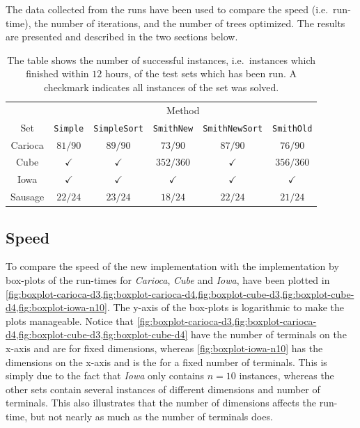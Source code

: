 The data collected from the runs have been used to compare the speed (i.e.\
run-time), the number of iterations, and the number of trees optimized. The
results are presented and described in the two sections below.

\begin{table}[htbp]
  \centering
  \begin{tabular}{cccccc}
    \toprule
            & \multicolumn{5}{c}{Method}                             \\
    Set     & \texttt{Simple} 
            & \texttt{SimpleSort}
            & \texttt{SmithNew} 
            & \texttt{SmithNewSort}
            & \texttt{SmithOld}                                      \\
    \cmidrule(r){1-1}\cmidrule(l){2-6}
    Carioca & $81/90$  & $89/90$  & $73/90$   & $87/90$  & $76/90$   \\
    Cube    & $\checkmark$ & $\checkmark$ & $352/360$ & $\checkmark$ & $356/360$ \\
    Iowa  & $\checkmark$ & $\checkmark$ & $\checkmark$  & $\checkmark$ & $\checkmark$  \\
    Sausage & $22/24$  & $23/24$  & $18/24$   & $22/24$  & $21/24$   \\
    \bottomrule
  \end{tabular}
  \caption[Successfull test runs]{The table shows the number of successful
    instances, i.e.\ instances which finished within $12$ hours, of the test
    sets which has been run. A checkmark indicates all instances of the set was
    solved.\label{tab:set-success}}
\end{table}

\subsection{Speed}
\label{sec:speed}

To compare the speed of the new implementation with the implementation by
\textcite{smith1992} box-plots of the run-times for \textit{Carioca},
\textit{Cube} and \textit{Iowa}, have been plotted in
\cref{fig:boxplot-carioca-d3,fig:boxplot-carioca-d4,fig:boxplot-cube-d3,fig:boxplot-cube-d4,fig:boxplot-iowa-n10}.
The y-axis of the box-plots is logarithmic to make the plots manageable. Notice
that
\cref{fig:boxplot-carioca-d3,fig:boxplot-carioca-d4,fig:boxplot-cube-d3,fig:boxplot-cube-d4}
have the number of terminals on the x-axis and are for fixed dimensions, whereas
\cref{fig:boxplot-iowa-n10} has the dimensions on the x-axis and is the for a
fixed number of terminals. This is simply due to the fact that \textit{Iowa}
only contains $n=10$ instances, whereas the other sets contain several instances
of different dimensions and number of terminals. This also illustrates that the
number of dimensions affects the run-time, but not nearly as much as the number
of terminals does.

